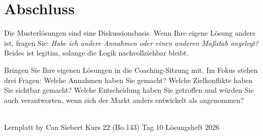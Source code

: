 \documentclass[11pt,a4paper,oneside]{article}
\begin{document}
\clearpage

\section*{Abschluss}
\thispagestyle{plain}

\noindent Die Musterlösungen sind eine Diskussionsbasis. Wenn Ihre eigene Lösung anders ist, fragen Sie: \emph{Habe ich andere Annahmen \textendash{} oder einen anderen Maßstab angelegt?} Beides ist legitim, solange die Logik nachvollziehbar bleibt.

\medskip
\begin{infobox}
Bringen Sie Ihre eigenen Lösungen in die Coaching-Sitzung mit. Im Fokus stehen drei Fragen: Welche Annahmen haben Sie gemacht? Welche Zielkonflikte haben Sie sichtbar gemacht? Welche Entscheidung haben Sie getroffen \textendash{} und würden Sie auch verantworten, wenn sich der Markt anders entwickelt als angenommen?
\end{infobox}

\vspace{1cm}
\noindent{\color{lpAccent}\rule{\linewidth}{0.6pt}}\\[4pt]
{\footnotesize\sffamily\color{lpGray}Lernplatt \textperiodcentered{} by Can Siebert \textperiodcentered{} Kurs 22 (Bo 143) \textperiodcentered{} Tag 10 \textperiodcentered{} Lösungsheft \textperiodcentered{} \textcopyright{} 2026}
\end{document}
